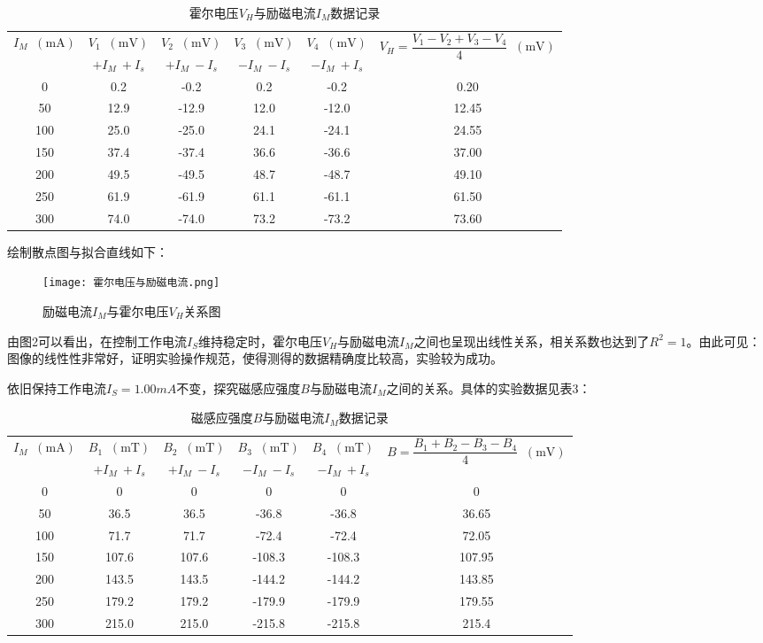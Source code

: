 \documentclass[11pt]{article}
\newcommand*{\unit}[1]{\mathop{}\!\mathrm{#1}}
\begin{document}
\begin{table}[H]
  \centering
  \caption{霍尔电压$V_H$与励磁电流$I_M$数据记录}
  \begin{tabular}{|c|c|c|c|c|c|}
      \hline
      \multirow{2}{*}{$I_M\unit{(mA)}$}&$V_1\unit{(mV)}$&$V_2\unit{(mV)}$&$V_3\unit{(mV)}$&$V_4\unit{(mV)}$&\multirow{2}{*}{$V_H = \dfrac{V_1 - V_2 + V_3 - V_4}{4} \unit{(mV)}$}\\
      \cline{2-5}
      &$+I_M \ +I_s$&$+I_M \ -I_s$&$-I_M \ -I_s$&$-I_M \ +I_s$&\\
      \hline
      0&0.2&-0.2&0.2&-0.2&0.20\\ \hline
      50&12.9&-12.9&12.0&-12.0&12.45\\ \hline
      100&25.0&-25.0&24.1&-24.1&24.55\\ \hline
      150&37.4&-37.4&36.6&-36.6&37.00\\ \hline
      200&49.5&-49.5&48.7&-48.7&49.10\\ \hline
      250&61.9&-61.9&61.1&-61.1&61.50\\ \hline
      300&74.0&-74.0&73.2&-73.2&73.60\\ \hline
  \end{tabular}
\end{table}

绘制散点图与拟合直线如下：

\begin{figure}[H]
  \centering
  \texttt{[image: 霍尔电压与励磁电流.png]}
  \caption{励磁电流$I_M$与霍尔电压$V_H$关系图}
\end{figure}

由图2可以看出，在控制工作电流$I_S$维持稳定时，霍尔电压$V_H$与励磁电流$I_M$之间也呈现出线性关系，相关系数也达到了$R^2=1$。由此可见：图像的线性性非常好，证明实验操作规范，使得测得的数据精确度比较高，实验较为成功。

依旧保持工作电流$I_S = 1.00mA$不变，探究磁感应强度$B$与励磁电流$I_M$之间的关系。具体的实验数据见表3：

\begin{table}[H]
  \centering
  \caption{磁感应强度$B$与励磁电流$I_M$数据记录}
  \begin{tabular}{|c|c|c|c|c|c|}
      \hline
      \multirow{2}{*}{$I_M\unit{(mA)}$}&$B_1\unit{(mT)}$&$B_2\unit{(mT)}$&$B_3\unit{(mT)}$&$B_4\unit{(mT)}$&\multirow{2}{*}{$B = \dfrac{B_1 + B_2 - B_3 - B_4}{4} \unit{(mV)}$}\\
      \cline{2-5}
      &$+I_M \ +I_s$&$+I_M \ -I_s$&$-I_M \ -I_s$&$-I_M \ +I_s$&\\
      \hline
      0&0&0&0&0&0\\ \hline
      50&36.5&36.5&-36.8&-36.8&36.65\\ \hline
      100&71.7&71.7&-72.4&-72.4&72.05\\ \hline
      150&107.6&107.6&-108.3&-108.3&107.95\\ \hline
      200&143.5&143.5&-144.2&-144.2&143.85\\ \hline
      250&179.2&179.2&-179.9&-179.9&179.55\\ \hline
      300&215.0&215.0&-215.8&-215.8&215.4\\ \hline
  \end{tabular}
\end{table}
\end{document}
